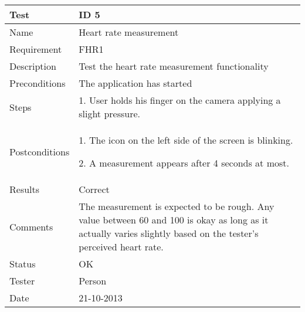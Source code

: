 \begin{table}
\begin{center}
\begin{tabular}{ | l | p{10cm} | }
	\hline
	\textbf{Test}	&	\textbf{ID 5} \\
	\hline\noalign{\smallskip}\noalign{\smallskip}\hline
	Name				& Heart rate measurement \\
	Requirement			& FHR1 \\
	Description			& Test the heart rate measurement functionality \\
	Preconditions		& The application has started \\
	Steps 				&	\par 1. User holds his finger on the camera applying a slight pressure. \\
	Postconditions		&	\par 1. The icon on the left side of the screen is blinking.
							\par 2. A measurement appears after 4 seconds at most.\\
	Results				& Correct \\
	Comments			&	The measurement is expected to be rough.
							Any value between 60 and 100 is okay as long as it actually varies slightly based
							on the tester's perceived heart rate.  \\
	Status				& OK \\
	Tester				& Person \\
	Date				& 21-10-2013 \\
	\hline
\end{tabular}
\end{center}
\end{table}